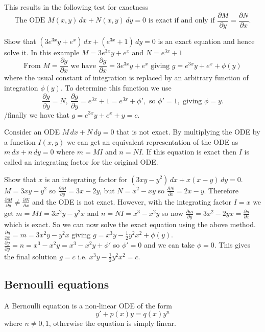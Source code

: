 \documentclass[10pt, a4paper]{article}
\begin{document}
This results in the following test for exactness
\[
\text{The ODE } M(x, y)\,dx + N(x, y)\,dy = 0\text{ is exact if and only if } \frac{\partial M}{\partial y} = \frac{\partial N}{\partial x}.
\]
\begin{example}
    Show that $(3e ^ {3x}y + e ^ x)\,dx + (e ^ {3x} + 1)\,dy = 0$ is an exact equation and hence solve it.
    In this example $M = 3e ^ {3x}y + e ^ x$ and $N = e ^ {3x} + 1$
    \[
    \text{From } M = \frac{\partial g}{\partial x}\text{ we have } \frac{\partial g}{\partial x} = 3e ^ {3x}y + e ^ x\text{ giving } g = e ^ {3x}y + e ^ x + \phi(y)
    \]
    where the usual constant of integration is replaced by an arbitrary function of integration $\phi(y)$.
    To determine this function we use
    \[
    \frac{\partial g}{\partial y} = N,\ \frac{\partial g}{\partial y} = e ^ {3x} + 1 = e ^ {3x} + \phi',\text{ so } \phi' = 1,\text{ giving }\phi = y.
    \]
    /finally we have that $g = e ^ {3x}y + e ^ x + y = c$.
\end{example}

Consider an ODE $M\,dx + N\,dy = 0$ that is not exact.
By multiplying the ODE by a function $I(x, y)$ we can get an equivalent representation of the ODE as $m\,dx + n\,dy = 0$ where $m = MI$ and $n = NI$.
If this equation is exact then $I$ is called an integrating factor for the original ODE.

\begin{example}
    Show that $x$ is an integrating factor for $(3xy - y ^ 2)\,dx + x(x - y)\,dy = 0$.
    $M = 3xy - y ^ 2$ so $\frac{\partial M}{\partial y} = 3x - 2y$,
    but $N = x ^ 2 - xy$ so $\frac{\partial N}{\partial x} = 2x - y$.
    Therefore $\frac{\partial M}{\partial y} \neq \frac{\partial N}{\partial x}$ and the ODE is not exact.
    However,
    with the integrating factor $I = x$ we get $m = MI = 3x ^ 2y - y ^ 2x$ and $n = NI = x ^ 3 - x ^ 2 y$ so now $\frac{\partial m}{\partial y} = 3x ^ 2 - 2yx = \frac{\partial n}{\partial x}$ which is exact.
    So we can now solve the exact equation using the above method.
    $\frac{\partial g}{\partial x} = m = 3x ^ 2y - y ^ 2x$ giving $g = x ^ 3y - \frac{1}{2}y ^ 2x ^ 2 + \phi(y)$.
    $\frac{\partial g}{\partial y} = n = x ^ 3 - x ^ 2y = x ^ 3 - x ^ 2 y + \phi'$ so $\phi' = 0$ and we can take $\phi = 0$.
    This gives the final solution $g = c$ i.e. $x ^ 3 y - \frac{1}{2}y ^ 2 x ^ 2 = c$.
\end{example}

\subsection{Bernoulli equations}
A Bernoulli equation is a non-linear ODE of the form
\[
y' + p(x)y = q(x)y ^ n
\]
where $n \neq 0, 1$,
otherwise the equation is simply linear.
\end{document}
